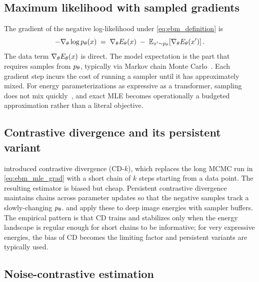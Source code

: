 \subsection{Maximum likelihood with sampled gradients}
\label{ssec:ebm_mle}

The gradient of the negative log-likelihood under \cref{eq:ebm_definition} is
\begin{equation}
  -\nabla_\theta \log p_\theta(x)
  \;=\; \nabla_\theta E_\theta(x)
     \;-\; \mathbb{E}_{x' \sim p_\theta}\!\left[\nabla_\theta E_\theta(x')\right].
  \label{eq:ebm_mle_grad}
\end{equation}
The data term $\nabla_\theta E_\theta(x)$ is direct.
The model expectation is the part that requires samples from $p_\theta$, typically via Markov chain Monte Carlo~\citep{hinton2002training,carreira2005contrastive}.
Each gradient step incurs the cost of running a sampler until it has approximately mixed.
For energy parameterizations as expressive as a transformer, sampling does not mix quickly~\citep{nijkamp2019learning,du2019implicit}, and exact MLE becomes operationally a budgeted approximation rather than a literal objective.

\subsection{Contrastive divergence and its persistent variant}
\label{ssec:cd}

\citet{hinton2002training} introduced contrastive divergence (CD-$k$), which replaces the long MCMC run in \cref{eq:ebm_mle_grad} with a short chain of $k$ steps starting from a data point.
The resulting estimator is biased but cheap.
Persistent contrastive divergence~\citep{tieleman2008training} maintains chains across parameter updates so that the negative samples track a slowly-changing $p_\theta$.
\citet{du2019implicit} and \citet{nijkamp2019learning} apply these to deep image energies with sampler buffers.
The empirical pattern is that CD trains and stabilizes only when the energy landscape is regular enough for short chains to be informative;
for very expressive energies, the bias of CD becomes the limiting factor and persistent variants are typically used.

\subsection{Noise-contrastive estimation}
\label{ssec:nce}


